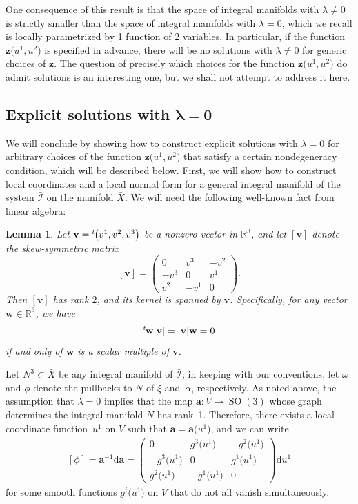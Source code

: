 \documentclass[pdftex]{sigma}
\numberwithin{equation}{section}
\newtheorem{Lemma}[Theorem]{Lemma}
\renewcommand{\d}{\mathrm{d}}%
\newcommand{\cI}{{\mathcal I}}
\newcommand{\bbR}{{\mathbb R}}
\newcommand{\SO}{\operatorname{SO}}
\newcommand{\mba}{\mathbf{a}}
\newcommand{\mbv}{\mathbf{v}}
\newcommand{\mbw}{\mathbf{w}}
\newcommand{\mbz}{\mathbf{z}}
\begin{document}
One consequence of this result is that the space of integral manifolds with $\lambda \neq 0$ is strictly smaller than the space of integral manifolds with $\lambda = 0$, which we recall is locally parametrized by 1 function of 2 variables. In particular, if the function $\mbz\big(u^1, u^2\big)$ is specified in advance, there will be no solutions with $\lambda \neq 0$ for generic choices of $\mbz$. The question of precisely which choices for the function $\mbz\big(u^1, u^2\big)$ do admit solutions is an interesting one, but we shall not attempt to address it here.

\subsection[Explicit solutions with $\lambda = 0$]{Explicit solutions with $\boldsymbol{\lambda = 0}$}\label{explicit-solns-sec}

We will conclude by showing how to construct explicit solutions with $\lambda=0$ for arbitrary choices of the function $\mbz\big(u^1, u^2\big)$ that satisfy a certain nondegeneracy condition, which will be described below. First, we will show how to construct local coordinates and a local normal form for a general integral manifold of the system $\bar{\cI}$ on the manifold $\bar{X}$. We will need the following well-known fact from linear algebra:

\begin{Lemma}\label{rank2-lemma}
Let $\mbv = {}^t\hskip-1pt\big(v^1, v^2, v^3\big)$ be a nonzero vector in $\bbR^3$, and let $[\mbv]$ denote the skew-symmetric matrix
\[ [\mbv] = \begin{pmatrix} 0 & v^3 & -v^2 \\-v^3 & 0 & v^1 \\ v^2 & -v^1 & 0 \end{pmatrix}. \]
Then $[\mbv]$ has rank $2$, and its kernel is spanned by $\mbv$. Specifically, for any vector $\mbw \in \bbR^3$, we have
\[ {}^t\hskip-1pt \mbw [\mbv] = [\mbv] \mbw = 0 \]
if and only of $\mbw$ is a scalar multiple of $\mbv$.
\end{Lemma}

Let $N^3 \subset \bar{X}$ be any integral manifold of $\bar{\cI}$; in keeping with our conventions, let $\omega$ and $\phi$ denote the pullbacks to $N$ of $\xi$ and~$\alpha$, respectively. As noted above, the assumption that $\lambda=0$ implies that the map $\mba\colon V \to \SO(3)$ whose graph determines the integral manifold $N$ has rank~1. Therefore, there exists a local coordinate function~$u^1$ on $V$ such that $\mba = \mba\big(u^1\big)$, and we can write
\begin{gather}\label{lambda-zero-matrix-f-eqn}
[\phi] = \mba^{-1} \d\mba = \begin{pmatrix}
0 & g^3\big(u^1\big) & -g^2\big(u^1\big) \\ -g^3\big(u^1\big) & 0 & g^1\big(u^1\big) \\ g^2\big(u^1\big) & -g^1\big(u^1\big) & 0 \end{pmatrix} \d u^1
\end{gather}
for some smooth functions $g^i\big(u^1\big)$ on $V$ that do not all vanish simultaneously.
\end{document}
